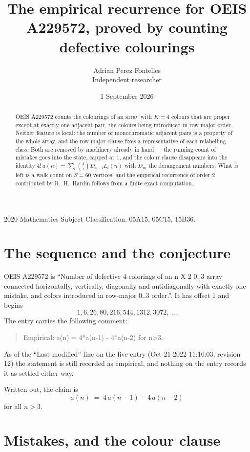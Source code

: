 \documentclass[11pt,a4paper]{article}
\title{The empirical recurrence for OEIS A229572, proved by counting defective colourings}
\author{Adrian Perez Fontelles\\ \small Independent researcher}
\date{1 September 2026}
\theoremstyle{plain}
\theoremstyle{definition}
\begin{document}
\maketitle

\begin{abstract}
OEIS A229572 counts the colourings of an array with $K=4$ colours that are proper except at
exactly one adjacent pair, the colours being introduced in row
major order. Neither feature is local: the number of monochromatic adjacent pairs is a
property of the whole array, and the row major clause fixes a representative of each
relabelling class. Both are removed by machinery already in hand --- the running count of
mistakes goes into the state, capped at $1$, and the colour clause disappears into the
identity $4!\,a(n)=\sum_i\binom{4}{i}D_{4-i}L_i(n)$ with $D_m$ the derangement
numbers. What is left is a walk count on $S=60$ vertices, and the empirical recurrence of
order $2$ contributed by R.~H.~Hardin follows from a finite exact computation.
\end{abstract}

\noindent\small 2020 Mathematics Subject Classification. 05A15, 05C15, 15B36.\normalsize

\section{The sequence and the conjecture}

OEIS A229572 is ``Number of defective 4-colorings of an n X 2 0..3 array connected horizontally, vertically, diagonally and antidiagonally with exactly one mistake, and colors introduced in row-major 0..3 order.''. It has offset $1$ and begins
\[
1, 6, 26, 80, 216, 544, 1312, 3072,\ \dots
\]
The entry carries the following comment:
\begin{quote}\small
Empirical: a(n) = 4*a(n-1) - 4*a(n-2) for n>3.
\end{quote}
As of the ``Last modified'' line on the live entry (Oct 21 2022 11:10:03, revision 12) the statement is
still recorded as empirical, and nothing on the entry records it as settled either way.

Written out, the claim is
\begin{equation}\label{eq:conj}
a(n)\;=\;4\,a(n-1) - 4\,a(n-2)
\end{equation}
for all $n>3$.

\section{Mistakes, and the colour clause}
\end{document}
